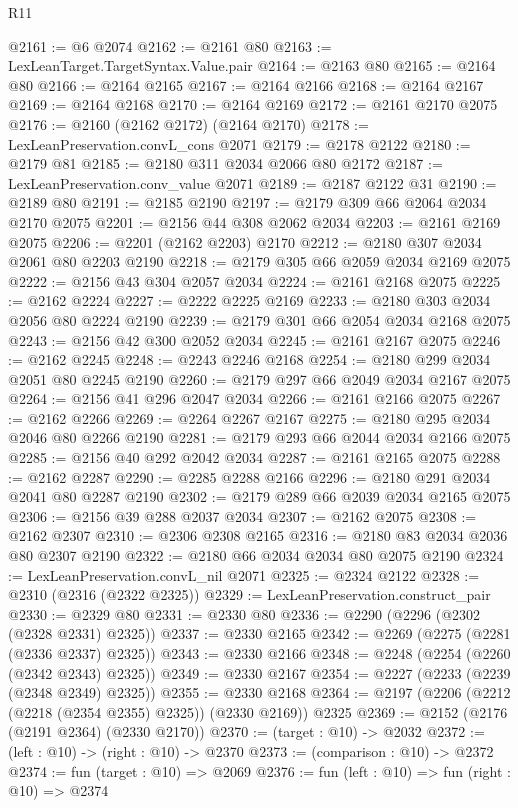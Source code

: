 \begin{lexlean}{R11}
\begin{coremodule}
@2161 := @6 @2074
@2162 := @2161 @80
@2163 := LexLeanTarget.TargetSyntax.Value.pair
@2164 := @2163 @80
@2165 := @2164 @80
@2166 := @2164 @2165
@2167 := @2164 @2166
@2168 := @2164 @2167
@2169 := @2164 @2168
@2170 := @2164 @2169
@2172 := @2161 @2170 @2075
@2176 := @2160 (@2162 @2172) (@2164 @2170)
@2178 := LexLeanPreservation.convL_cons @2071
@2179 := @2178 @2122
@2180 := @2179 @81
@2185 := @2180 @311 @2034 @2066 @80 @2172
@2187 := LexLeanPreservation.conv_value @2071
@2189 := @2187 @2122 @31
@2190 := @2189 @80
@2191 := @2185 @2190
@2197 := @2179 @309 @66 @2064 @2034 @2170 @2075
@2201 := @2156 @44 @308 @2062 @2034
@2203 := @2161 @2169 @2075
@2206 := @2201 (@2162 @2203) @2170
@2212 := @2180 @307 @2034 @2061 @80 @2203 @2190
@2218 := @2179 @305 @66 @2059 @2034 @2169 @2075
@2222 := @2156 @43 @304 @2057 @2034
@2224 := @2161 @2168 @2075
@2225 := @2162 @2224
@2227 := @2222 @2225 @2169
@2233 := @2180 @303 @2034 @2056 @80 @2224 @2190
@2239 := @2179 @301 @66 @2054 @2034 @2168 @2075
@2243 := @2156 @42 @300 @2052 @2034
@2245 := @2161 @2167 @2075
@2246 := @2162 @2245
@2248 := @2243 @2246 @2168
@2254 := @2180 @299 @2034 @2051 @80 @2245 @2190
@2260 := @2179 @297 @66 @2049 @2034 @2167 @2075
@2264 := @2156 @41 @296 @2047 @2034
@2266 := @2161 @2166 @2075
@2267 := @2162 @2266
@2269 := @2264 @2267 @2167
@2275 := @2180 @295 @2034 @2046 @80 @2266 @2190
@2281 := @2179 @293 @66 @2044 @2034 @2166 @2075
@2285 := @2156 @40 @292 @2042 @2034
@2287 := @2161 @2165 @2075
@2288 := @2162 @2287
@2290 := @2285 @2288 @2166
@2296 := @2180 @291 @2034 @2041 @80 @2287 @2190
@2302 := @2179 @289 @66 @2039 @2034 @2165 @2075
@2306 := @2156 @39 @288 @2037 @2034
@2307 := @2162 @2075
@2308 := @2162 @2307
@2310 := @2306 @2308 @2165
@2316 := @2180 @83 @2034 @2036 @80 @2307 @2190
@2322 := @2180 @66 @2034 @2034 @80 @2075 @2190
@2324 := LexLeanPreservation.convL_nil @2071
@2325 := @2324 @2122
@2328 := @2310 (@2316 (@2322 @2325))
@2329 := LexLeanPreservation.construct_pair
@2330 := @2329 @80
@2331 := @2330 @80
@2336 := @2290 (@2296 (@2302 (@2328 @2331) @2325))
@2337 := @2330 @2165
@2342 := @2269 (@2275 (@2281 (@2336 @2337) @2325))
@2343 := @2330 @2166
@2348 := @2248 (@2254 (@2260 (@2342 @2343) @2325))
@2349 := @2330 @2167
@2354 := @2227 (@2233 (@2239 (@2348 @2349) @2325))
@2355 := @2330 @2168
@2364 := @2197 (@2206 (@2212 (@2218 (@2354 @2355) @2325)) (@2330 @2169)) @2325
@2369 := @2152 (@2176 (@2191 @2364) (@2330 @2170))
@2370 := (target : @10) -> @2032
@2372 := (left : @10) -> (right : @10) -> @2370
@2373 := (comparison : @10) -> @2372
@2374 := fun (target : @10) => @2069
@2376 := fun (left : @10) => fun (right : @10) => @2374

\end{coremodule}
\end{lexlean}
